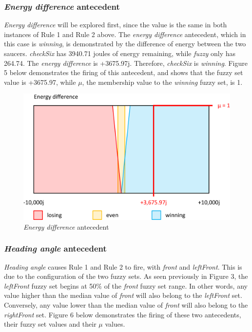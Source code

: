 \subsubsection{\emph{Energy difference} antecedent}

\emph{Energy difference} will be explored first, since the value is the same in both instances of Rule 1 and Rule 2 above. The \emph{energy difference} antecedent, which in this case is \emph{winning}, is demonstrated by the difference of energy between the two saucers. \emph{checkSix} has 3940.71 joules of energy remaining, while \emph{fuzzy} only has 264.74. The \emph{energy difference} is +3675.97j. Therefore, \emph{checkSix} is \emph{winning}. Figure 5 below demonstrates the firing of this antecedent, and shows that the fuzzy set value is +3675.97, while $\mu$, the membership value to the \emph{winning} fuzzy set, is 1.

\begin{figure}[H]
\centering
\caption{\emph{Energy difference} antecedent}
\includegraphics[scale=0.1]{./img/pdf/turnRule_energyDiff.pdf}
\end{figure}

\subsubsection{\emph{Heading angle} antecedent}

\emph{Heading angle} causes Rule 1 and Rule 2 to fire, with \emph{front} and \emph{leftFront}. This is due to the configuration of the two fuzzy sets. As seen previously in Figure 3, the \emph{leftFront} fuzzy set begins at 50\% of the \emph{front} fuzzy set range. In other words, any value higher than the median value of \emph{front} will also belong to the \emph{leftFront} set. Conversely, any value lower than the median value of \emph{front} will also belong to the \emph{rightFront} set. Figure 6 below demonstrates the firing of these two antecedents, their fuzzy set values and their $\mu$ values.

